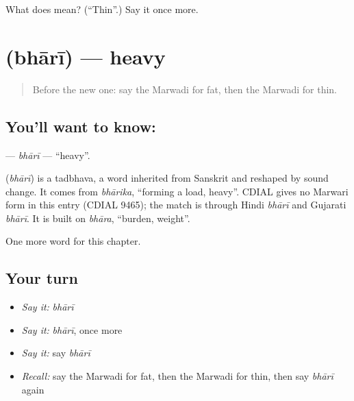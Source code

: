 \begin{tcolorbox}[breakable,colback=teal!4,colframe=teal!35!black,title={Before you move on}]
What does  mean? (\textquotedblleft{}Thin\textquotedblright{}.) Say it once more.
\end{tcolorbox}
\section[\texorpdfstring{\mw{भारी} (bhārī)}{भारी (bhārī)}]{ (bhārī) — heavy}

\label{lesson:MW-C76-bhari}



\begin{quote}
Before the new one: say the Marwadi for fat, then the Marwadi for thin.
\end{quote}

\subsection*{You'll want to know: }
\textbf{} — \emph{bhārī} — \textquotedblleft{}heavy\textquotedblright{}.

\begin{cousinweb}
\textbf{} (\emph{bhārī}) is a tadbhava, a word inherited from Sanskrit and reshaped by sound change. It comes from \emph{bhārika}, \textquotedblleft{}forming a load, heavy\textquotedblright{}. CDIAL gives no Marwari form in this entry (CDIAL 9465); the match is through Hindi \emph{bhārī} and Gujarati \emph{bhārī}. It is built on \emph{bhāra}, \textquotedblleft{}burden, weight\textquotedblright{}.
\end{cousinweb}

\begin{grammarlens}[title={What you've built}]
One more word for this chapter.
\end{grammarlens}

\subsection*{Your turn}
\begin{itemize}
\raggedright
  \item \emph{Say it:} \emph{bhārī}
  \item \emph{Say it:} \emph{bhārī}, once more
  \item \emph{Say it:} say \emph{bhārī}
  \item \emph{Recall:} say the Marwadi for fat, then the Marwadi for thin, then say \emph{bhārī} again
\end{itemize}

